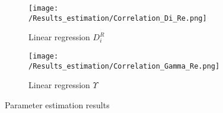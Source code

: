 \documentclass[../Supercritical_fluid_extraction_of_essential_oil_from_chamomile.tex]{subfiles}
\begin{document}
	\begin{figure}
		\centering
		\begin{subfigure}[b]{\columnwidth}
			\centering
			\texttt{[image: /Results\_estimation/Correlation\_Di\_Re.png]}
			\caption{Linear regression $D_i^R$}
			\label{fig: Correlations_Di_Re}
		\end{subfigure}
		\hfill
		\begin{subfigure}[b]{\columnwidth}
			\centering
			\texttt{[image: /Results\_estimation/Correlation\_Gamma\_Re.png]}
			\caption{Linear regression $\Upsilon$}
			\label{fig: Correlations_Gamma_Re}
		\end{subfigure}
		\caption{Parameter estimation results}
		\label{fig: Correlations}
	\end{figure}
	
\end{document}
